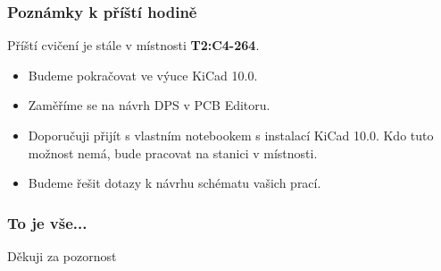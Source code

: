 \documentclass{beamer}
\newcommand{\kicadVersion}{10.0}
\begin{document}
	\begin{frame}
    \frametitle{Poznámky k příští hodině}
		
		Příští cvičení je stále v místnosti \textbf{T2:C4-264}.
		\begin{itemize}
			\item Budeme pokračovat ve výuce KiCad \kicadVersion.
			\item Zaměříme se na návrh DPS v PCB Editoru.
			\item Doporučuji přijít s vlastním notebookem s instalací KiCad \kicadVersion. Kdo tuto možnost nemá, bude pracovat na stanici v místnosti.
      \item Budeme řešit dotazy k návrhu schématu vašich prací.
		\end{itemize}
	\end{frame}
	\begin{frame}
    \frametitle{To je vše...}
		
		\begin{center}
			\Large{Děkuji za pozornost}
		\end{center}
	\end{frame}
\end{document}
